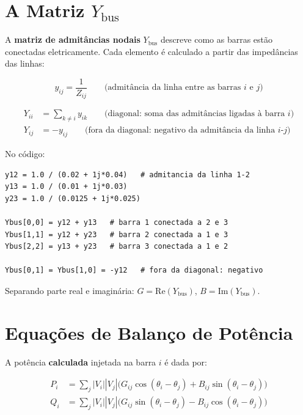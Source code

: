 \documentclass[
  12pt,
  a4paper,
  oneside,
  brazil
]{abntex2}
\begin{document}
\chapter{A Matriz $Y_{\text{bus}}$}

A \textbf{matriz de admitâncias nodais} $Y_{\text{bus}}$ descreve como as
barras estão conectadas eletricamente. Cada elemento é calculado a partir
das impedâncias das linhas:

\begin{equation}
  y_{ij} = \frac{1}{Z_{ij}}
  \qquad \text{(admitância da linha entre as barras } i \text{ e } j\text{)}
\end{equation}

\begin{align}
  Y_{ii} &= \sum_{k \neq i} y_{ik}
    \qquad \text{(diagonal: soma das admitâncias ligadas à barra } i\text{)}\\
  Y_{ij} &= -y_{ij}
    \qquad \text{(fora da diagonal: negativo da admitância da linha } i\text{-}j\text{)}
\end{align}

No código:

\begin{lstlisting}
y12 = 1.0 / (0.02 + 1j*0.04)   # admitancia da linha 1-2
y13 = 1.0 / (0.01 + 1j*0.03)
y23 = 1.0 / (0.0125 + 1j*0.025)

Ybus[0,0] = y12 + y13   # barra 1 conectada a 2 e 3
Ybus[1,1] = y12 + y23   # barra 2 conectada a 1 e 3
Ybus[2,2] = y13 + y23   # barra 3 conectada a 1 e 2

Ybus[0,1] = Ybus[1,0] = -y12   # fora da diagonal: negativo
\end{lstlisting}

Separando parte real e imaginária: $G = \text{Re}(Y_{\text{bus}})$,
$B = \text{Im}(Y_{\text{bus}})$.

\chapter{Equações de Balanço de Potência}

A potência \textbf{calculada} injetada na barra $i$ é dada por:

\begin{align}
  P_i &= \sum_{j} |V_i||V_j|\bigl(G_{ij}\cos(\theta_i - \theta_j)
         + B_{ij}\sin(\theta_i - \theta_j)\bigr) \\
  Q_i &= \sum_{j} |V_i||V_j|\bigl(G_{ij}\sin(\theta_i - \theta_j)
         - B_{ij}\cos(\theta_i - \theta_j)\bigr)
\end{align}
\end{document}
